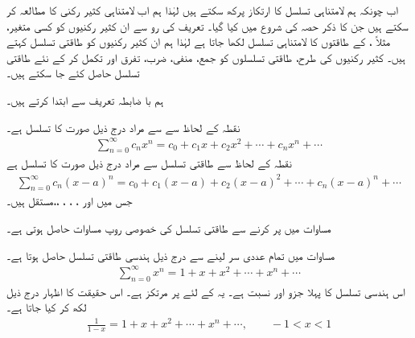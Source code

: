 اب چونکہ ہم لامتناہی تسلسل کا ارتکاز پرکھ سکتے ہیں لہٰذا ہم اب لامتناہی کثیر رکنی کا مطالعہ کر سکتے ہیں جن کا ذکر حصہ  کی شروع میں کیا گیا۔ تعریف کی رو سے ان کثیر رکنیوں کو کسی متغیر، مثلاً ،  کے طاقتوں کا لامتناہی تسلسل لکھا جاتا ہے لہٰذا ہم ان کثیر رکنیوں کو طاقتی تسلسل کہتے ہیں۔ کثیر رکنیوں کی طرح، طاقتی تسلسلوں کو جمع، منفی، ضرب، تفرق اور تکمل کر کے نئے طاقتی تسلسل حاصل کئے جا سکتے ہیں۔

ہم با ضابطہ تعریف سے ابتدا کرتے ہیں۔

نقطہ  کے لحاظ سے  سے مراد درج ذیل صورت کا تسلسل ہے۔
\begin{align}\label{مساوات_تسلسل_تعریف_طاقتی_الف}
\sum_{n=0}^{\infty}c_nx^n=c_0+c_1x+c_2x^2+\cdots+c_nx^n+\cdots
\end{align}
نقطہ  کے لحاظ سے طاقتی تسلسل سے مراد درج ذیل صورت کا تسلسل ہے
\begin{align}\label{مساوات_تسلسل_تعریف_طاقتی_ب}
\sum_{n=0}^{\infty}c_n(x-a)^n=c_0+c_1(x-a)+c_2(x-a)^2+\cdots+c_n(x-a)^n+\cdots
\end{align}
جس میں   اور  ، ، ، ،، مستقل ہیں۔

مساوات  میں  پر کرنے سے طاقتی تسلسل کی خصوصی روپ مساوات  حاصل ہوتی ہے۔

مساوات  میں تمام عددی سر  لینے سے درج ذیل ہندسی طاقتی تسلسل حاصل ہوتا ہے۔
\begin{align*}
\sum_{n=0}^{\infty}x^n=1+x+x^2+\cdots+x^n+\cdots
\end{align*}
اس ہندسی تسلسل کا پہلا جزو  اور نسبت  ہے۔ یہ  کے لئے  پر مرتکز ہے۔ اس حقیقت کا اظہار درج ذیل لکھ کر کیا جاتا ہے۔
\begin{align}\label{مساوات_تسلسل_تعریف_طاقتی_پ}
\frac{1}{1-x}=1+x+x^2+\cdots+x^n+\cdots,\quad\quad -1<x<1
\end{align}

